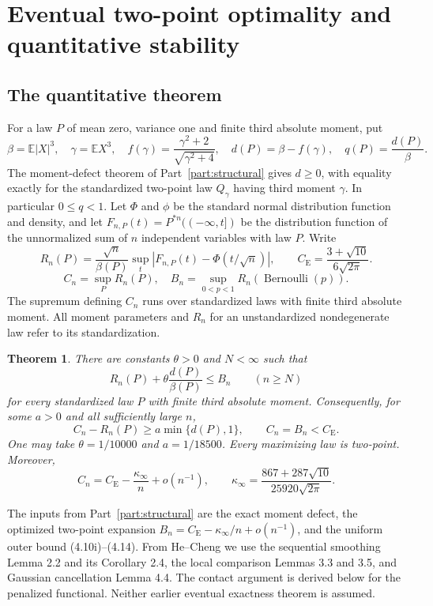\documentclass[11pt,a4paper]{article}
\numberwithin{equation}{section}
\newtheorem{theorem}{Theorem}[section]
\theoremstyle{definition}
\theoremstyle{remark}
\newcommand{\E}{\mathbb E}
\newcommand{\CE}{C_{\mathrm E}}
\begin{document}
\section{Eventual two-point optimality and quantitative stability}\label{stab:section}
\subsection{The quantitative theorem}

For a law $P$ of mean zero, variance one and finite third absolute
moment, put
\[
 \beta=\E|X|^3,\quad \gamma=\E X^3,\quad
 f(\gamma)=\frac{\gamma^2+2}{\sqrt{\gamma^2+4}},\quad
 d(P)=\beta-f(\gamma),\quad q(P)=\frac{d(P)}{\beta}.
\]
The moment-defect theorem of Part~\ref{part:structural} gives $d\ge0$, with equality
exactly for the standardized two-point law $Q_\gamma$ having third
moment $\gamma$. In particular $0\le q<1$. Let $\Phi$ and $\phi$
be the standard normal distribution function and density, and let
$F_{n,P}(t)=P^{*n}(({-\infty},t])$ be the distribution function
of the unnormalized sum of $n$ independent variables with law $P$.
Write
\[
 R_n(P)=\frac{\sqrt n}{\beta(P)}
    \sup_t|F_{n,P}(t)-\Phi(t/\sqrt n)|,\qquad
 \CE=\frac{3+\sqrt{10}}{6\sqrt{2\pi}}.
\]
\[
 C_n=\sup_P R_n(P),\quad
 B_n=\sup_{0<p<1}R_n(\operatorname{Bernoulli}(p)).
\]
The supremum defining $C_n$ runs over standardized laws with finite
third absolute moment. All moment parameters and $R_n$ for an
unstandardized nondegenerate law refer to its standardization.

\begin{theorem}\label{stab:thm:penalty}
There are constants $\theta>0$ and $N<\infty$ such that
\begin{equation}\label{stab:eq:penalty-bound}
 R_n(P)+\theta\frac{d(P)}{\beta(P)}\le B_n
                 \qquad(n\ge N)
\end{equation}
for every standardized law $P$ with finite third absolute moment.
Consequently, for some $a>0$ and all sufficiently large $n$,
\begin{equation}\label{stab:eq:linear-bound}
 C_n-R_n(P)\ge a\min\{d(P),1\},\qquad C_n=B_n<\CE.
\end{equation}
One may take $\theta=1/10000$ and $a=1/18500$.
Every maximizing law is two-point. Moreover,
\[
 C_n=\CE-\frac{\kappa_\infty}{n}+o(n^{-1}),\qquad
 \kappa_\infty=\frac{867+287\sqrt{10}}{25920\sqrt{2\pi}}.
\]
\end{theorem}

The inputs from Part~\ref{part:structural} are the exact moment defect, the optimized
two-point expansion $B_n=\CE-\kappa_\infty/n+o(n^{-1})$, and the
uniform outer bound (4.10i)--(4.14). From He--Cheng \cite{HC} we use
the sequential smoothing Lemma 2.2 and its Corollary 2.4, the local
comparison Lemmas 3.3 and 3.5, and Gaussian cancellation Lemma 4.4.
The contact argument is derived below for the penalized functional.
Neither earlier eventual exactness theorem is assumed.
\end{document}
